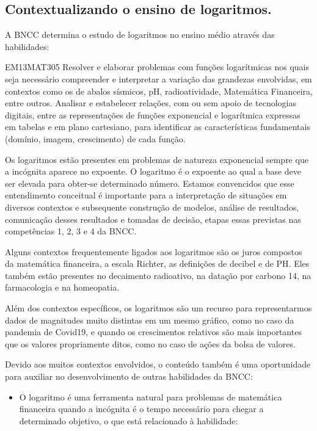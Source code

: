 \mainmatter

\begin{apresentacao}
\section*{Contextualizando o ensino de logaritmos.}
A BNCC determina o estudo de logaritmos no ensino médio através das habilidades:

\begin{habilities}{EM13MAT305}
Resolver e elaborar problemas com funções logarítmicas nos quais seja necessário compreender e interpretar a variação das grandezas envolvidas, em contextos como os de abalos sísmicos, pH, radioatividade, Matemática Financeira, entre outros.
Analisar e estabelecer relações, com ou sem apoio de tecnologias digitais, entre as representações de funções exponencial e logarítmica expressas em tabelas e em plano cartesiano, para identificar as características fundamentais (domínio, imagem, crescimento) de cada função.
\end{habilities}

Os logaritmos estão presentes em problemas de natureza exponencial sempre que a incógnita aparece no expoente. O logaritmo é o expoente ao qual a base deve ser elevada para obter-se determinado número. Estamos convencidos que esse entendimento conceitual é importante para a interpretação de situações em diversos contextos e subsequente construção de modelos, análise de resultados, comunicação desses resultados e  tomadas de decisão, etapas essas previstas nas competências 1, 2, 3 e 4 da BNCC.


Alguns contextos frequentemente ligados aos logaritmos são os juros compostos da matemática financeira, a escala Richter, as definições de decibel e de PH. Eles também estão presentes no decaimento radioativo, na datação por carbono 14, na farmacologia e na homeopatia.

Além dos contextos específicos, os logaritmos são um recurso para representarmos dados de magnitudes muito distintas em um mesmo gráfico, como no caso da pandemia de Covid19, e quando os crescimentos relativos são mais importantes que os valores propriamente ditos, como no caso de ações da bolsa de valores.

Devido aos muitos contextos envolvidos, o conteúdo também é uma oportunidade para auxiliar no desenvolvimento de outras habilidades da BNCC:
\begin{itemize}
\item O logaritmo é uma ferramenta natural para problemas de matemática financeira quando a incógnita é o tempo necessário para chegar a determinado objetivo, o que está relacionado à habilidade:
\end{itemize}


\end{apresentacao}
